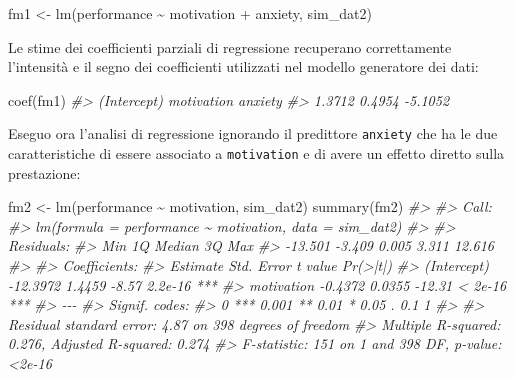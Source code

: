 \documentclass[
  11pt,
]{krantz}
\makeatletter
\newenvironment{Shaded}{\begin{snugshade}}{\end{snugshade}}
\newcommand{\CommentTok}[1]{\textcolor[rgb]{0.37,0.37,0.37}{\textit{#1}}}
\newcommand{\FunctionTok}[1]{\textcolor[rgb]{0,0,0}{#1}}
\newcommand{\NormalTok}[1]{#1}
\newcommand{\OtherTok}[1]{\textcolor[rgb]{0.37,0.37,0.37}{#1}}
\newcommand{\SpecialCharTok}[1]{\textcolor[rgb]{0,0,0}{#1}}
\newenvironment{kframe}{%
\medskip{}
\setlength{\fboxsep}{.8em}
 \def\at@end@of@kframe{}%
 \ifinner\ifhmode%
  \def\at@end@of@kframe{\end{minipage}}%
  \begin{minipage}{\columnwidth}%
 \fi\fi%
 \def\FrameCommand##1{\hskip\@totalleftmargin \hskip-\fboxsep
 \colorbox{shadecolor}{##1}\hskip-\fboxsep
     \hskip-\linewidth \hskip-\@totalleftmargin \hskip\columnwidth}%
 \MakeFramed {\advance\hsize-\width
   \@totalleftmargin\z@ \linewidth\hsize
   \@setminipage}}%
 {\par\unskip\endMakeFramed%
 \at@end@of@kframe}
\renewenvironment{Shaded}{\begin{kframe}}{\end{kframe}}
\theoremstyle{definition}
\theoremstyle{definition}
\theoremstyle{definition}
\theoremstyle{definition}
\theoremstyle{remark}
\makeatother
\begin{document}
\begin{Shaded}
\begin{Highlighting}[]
\NormalTok{fm1 }\OtherTok{\textless{}{-}} \FunctionTok{lm}\NormalTok{(performance }\SpecialCharTok{\textasciitilde{}}\NormalTok{ motivation }\SpecialCharTok{+}\NormalTok{ anxiety, sim\_dat2)}
\end{Highlighting}
\end{Shaded}

Le stime dei coefficienti parziali di regressione recuperano correttamente l'intensità e il segno dei coefficienti utilizzati nel modello generatore dei dati:

\begin{Shaded}
\begin{Highlighting}[]
\FunctionTok{coef}\NormalTok{(fm1)}
\CommentTok{\#\textgreater{} (Intercept)  motivation     anxiety }
\CommentTok{\#\textgreater{}      1.3712      0.4954     {-}5.1052}
\end{Highlighting}
\end{Shaded}

Eseguo ora l'analisi di regressione ignorando il predittore \texttt{anxiety} che ha le due caratteristiche di essere associato a \texttt{motivation} e di avere un effetto diretto sulla prestazione:

\begin{Shaded}
\begin{Highlighting}[]
\NormalTok{fm2 }\OtherTok{\textless{}{-}} \FunctionTok{lm}\NormalTok{(performance }\SpecialCharTok{\textasciitilde{}}\NormalTok{ motivation, sim\_dat2)}
\FunctionTok{summary}\NormalTok{(fm2)}
\CommentTok{\#\textgreater{} }
\CommentTok{\#\textgreater{} Call:}
\CommentTok{\#\textgreater{} lm(formula = performance \textasciitilde{} motivation, data = sim\_dat2)}
\CommentTok{\#\textgreater{} }
\CommentTok{\#\textgreater{} Residuals:}
\CommentTok{\#\textgreater{}     Min      1Q  Median      3Q     Max }
\CommentTok{\#\textgreater{} {-}13.501  {-}3.409   0.005   3.311  12.616 }
\CommentTok{\#\textgreater{} }
\CommentTok{\#\textgreater{} Coefficients:}
\CommentTok{\#\textgreater{}             Estimate Std. Error t value Pr(\textgreater{}|t|)    }
\CommentTok{\#\textgreater{} (Intercept) {-}12.3972     1.4459   {-}8.57  2.2e{-}16 ***}
\CommentTok{\#\textgreater{} motivation   {-}0.4372     0.0355  {-}12.31  \textless{} 2e{-}16 ***}
\CommentTok{\#\textgreater{} {-}{-}{-}}
\CommentTok{\#\textgreater{} Signif. codes:  }
\CommentTok{\#\textgreater{} 0 \textquotesingle{}***\textquotesingle{} 0.001 \textquotesingle{}**\textquotesingle{} 0.01 \textquotesingle{}*\textquotesingle{} 0.05 \textquotesingle{}.\textquotesingle{} 0.1 \textquotesingle{} \textquotesingle{} 1}
\CommentTok{\#\textgreater{} }
\CommentTok{\#\textgreater{} Residual standard error: 4.87 on 398 degrees of freedom}
\CommentTok{\#\textgreater{} Multiple R{-}squared:  0.276,  Adjusted R{-}squared:  0.274 }
\CommentTok{\#\textgreater{} F{-}statistic:  151 on 1 and 398 DF,  p{-}value: \textless{}2e{-}16}
\end{Highlighting}
\end{Shaded}
\end{document}
